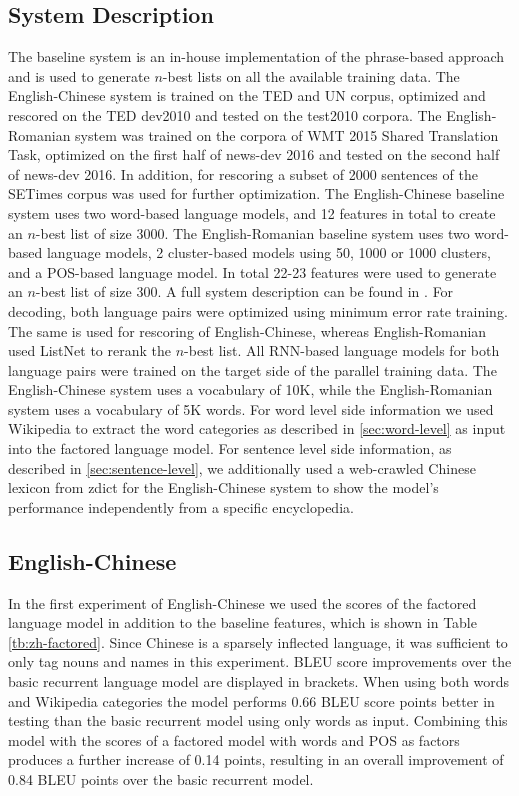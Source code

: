 \documentclass[a4paper]{article}
\begin{document}
\subsection{System Description}
The baseline system is an in-house implementation of the phrase-based approach and is used to generate $n$-best lists on all the available training data. The English-Chinese system is trained on the TED and UN corpus, optimized and rescored on the TED dev2010 and tested on the test2010 corpora.
The English-Romanian system was trained on the corpora of WMT 2015 Shared Translation Task, optimized on the first half of news-dev 2016 and tested on the second half of news-dev 2016. In addition, for rescoring a subset of 2000 sentences of the SETimes corpus was used for further optimization.
The English-Chinese baseline system uses two word-based language models, and 12 features in total to create an $n$-best list of size 3000.
The English-Romanian baseline system uses two word-based language models, 2 cluster-based models using 50, 1000 or 1000 clusters, and a POS-based language model. In total 22-23 features were used to generate an $n$-best list of size 300. A full system description can be found in \cite{niehuesusing}.
For decoding, both language pairs were optimized using minimum error rate training. The same is used for rescoring of English-Chinese, whereas English-Romanian used ListNet to rerank the $n$-best list.
All RNN-based language models for both language pairs were trained on the target side of the parallel training data. The English-Chinese system uses a vocabulary of 10K, while the English-Romanian system uses a vocabulary of 5K words. For word level side information we used Wikipedia to extract the word categories as described in \ref{sec:word-level} as input into the factored language model.
For sentence level side information, as described in \ref{sec:sentence-level}, we additionally used a web-crawled Chinese lexicon from zdict for the English-Chinese system to show the model's performance independently from a specific encyclopedia.


\subsection{English-Chinese}
In the first experiment of English-Chinese we used the scores of the factored language model in addition to the baseline features, which is shown in Table \ref{tb:zh-factored}. Since Chinese is a sparsely inflected language, it was sufficient to only tag nouns and names in this experiment. BLEU score improvements over the basic recurrent language model are displayed in brackets. When using both words and Wikipedia categories the model performs 0.66 BLEU score points better in testing than the basic recurrent model using only words as input. Combining this model with the scores of a factored model with words and POS as factors produces a further increase of 0.14 points, resulting in an overall improvement of 0.84 BLEU points over the basic recurrent model.
\end{document}
